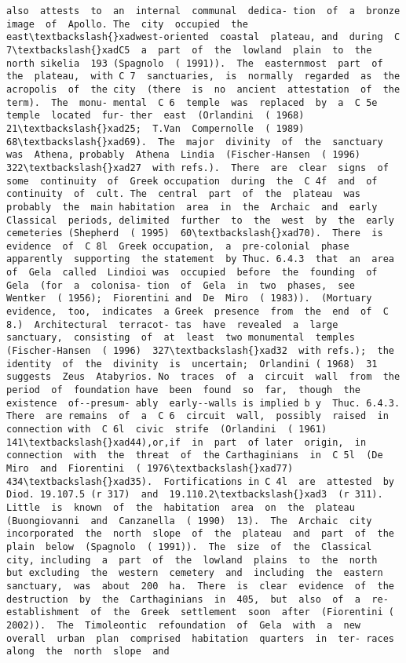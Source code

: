 \documentclass[11pt]{article}
\begin{document}
\begin{Verbatim}[commandchars=\\\{\}]
also  attests  to  an  internal  communal  dedica- tion  of  a  bronze  image  of  Apollo. The  city  occupied  the  east\textbackslash{}xadwest-oriented  coastal  plateau, and  during  C 7\textbackslash{}xadC5  a  part  of  the  lowland  plain  to  the  north sikelia  193 (Spagnolo  ( 1991)).  The  easternmost  part  of  the  plateau,  with C 7  sanctuaries,  is  normally  regarded  as  the  acropolis  of  the city  (there  is  no  ancient  attestation  of  the  term).  The  monu- mental  C 6  temple  was  replaced  by  a  C 5e  temple  located  fur- ther  east  (Orlandini  ( 1968)  21\textbackslash{}xad25;  T.Van  Compernolle  ( 1989) 68\textbackslash{}xad69).  The  major  divinity  of  the  sanctuary  was  Athena, probably  Athena  Lindia  (Fischer-Hansen  ( 1996)  322\textbackslash{}xad27  with refs.).  There  are  clear  signs  of  some  continuity  of  Greek occupation  during  the  C 4f  and  of  continuity  of  cult. The  central  part  of  the  plateau  was  probably  the  main habitation  area  in  the  Archaic  and  early  Classical  periods, delimited  further  to  the  west  by  the  early  cemeteries (Shepherd  ( 1995)  60\textbackslash{}xad70).  There  is  evidence  of  C 8l  Greek occupation,  a  pre-colonial  phase  apparently  supporting  the statement  by Thuc. 6.4.3  that  an  area  of  Gela  called  Lindioi was  occupied  before  the  founding  of  Gela  (for  a  colonisa- tion  of  Gela  in  two  phases,  see  Wentker  ( 1956);  Fiorentini and  De  Miro  ( 1983)).  (Mortuary  evidence,  too,  indicates  a Greek  presence  from  the  end  of  C 8.)  Architectural  terracot- tas  have  revealed  a  large  sanctuary,  consisting  of  at  least  two monumental  temples  (Fischer-Hansen  ( 1996)  327\textbackslash{}xad32  with refs.);  the  identity  of  the  divinity  is  uncertain;  Orlandini ( 1968)  31  suggests  Zeus  Atabyrios. No  traces  of  a  circuit  wall  from  the  period  of  foundation have  been  found  so  far,  though  the  existence  of--presum- ably  early--walls is implied b y  Thuc. 6.4.3.  There  are remains  of  a  C 6  circuit  wall,  possibly  raised  in  connection with  C 6l  civic  strife  (Orlandini  ( 1961)  141\textbackslash{}xad44),or,if  in  part  of later  origin,  in  connection  with  the  threat  of  the Carthaginians  in  C 5l  (De  Miro  and  Fiorentini  ( 1976\textbackslash{}xad77) 434\textbackslash{}xad35).  Fortifications in C 4l  are  attested  by  Diod. 19.107.5 (r 317)  and  19.110.2\textbackslash{}xad3  (r 311). Little  is  known  of  the  habitation  area  on  the  plateau (Buongiovanni  and  Canzanella  ( 1990)  13).  The  Archaic  city incorporated  the  north  slope  of  the  plateau  and  part  of  the plain  below  (Spagnolo  ( 1991)).  The  size  of  the  Classical  city, including  a  part  of  the  lowland  plains  to  the  north  but excluding  the  western  cemetery  and  including  the  eastern sanctuary,  was  about  200  ha.  There  is  clear  evidence  of  the destruction  by  the  Carthaginians  in  405,  but  also  of  a  re- establishment  of  the  Greek  settlement  soon  after  (Fiorentini ( 2002)).  The  Timoleontic  refoundation  of  Gela  with  a  new overall  urban  plan  comprised  habitation  quarters  in  ter- races  along  the  north  slope  and  
\end{Verbatim}
\end{document}
